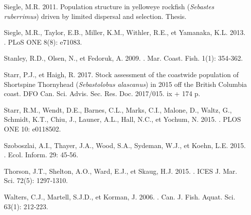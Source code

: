 \documentclass[french,11pt]{book}
\begin{document}
\begin{CSLReferences}{1}{0}
%
Siegle, M.R. 2011. Population structure in yelloweye rockfish ({\emph{Sebastes ruberrimus}}) driven by limited dispersal and selection. Thesis.

%
Siegle, M.R., Taylor, E.B., Miller, K.M., Withler, R.E., et Yamanaka, K.L. 2013. . PLoS ONE 8(8): e71083.

%
Stanley, R.D., Olsen, N., et Fedoruk, A. 2009. . Mar. Coast. Fish. 1(1): 354‑362.

%
Starr, P.J., et Haigh, R. 2017. Stock assessment of the coastwide population of {Shortspine Thornyhead} ({\emph{Sebastolobus alascanus}}) in 2015 off the {British Columbia} coast. {DFO} Can. Sci. Advis. Sec. Res. Doc. 2017/015. ix + 174 p.

%
Starr, R.M., Wendt, D.E., Barnes, C.L., Marks, C.I., Malone, D., Waltz, G., Schmidt, K.T., Chiu, J., Launer, A.L., Hall, N.C., et Yochum, N. 2015. . PLOS ONE 10: e0118502.

%
Szoboszlai, A.I., Thayer, J.A., Wood, S.A., Sydeman, W.J., et Koehn, L.E. 2015. . Ecol. Inform. 29: 45‑56.

%
Thorson, J.T., Shelton, A.O., Ward, E.J., et Skaug, H.J. 2015. . ICES J. Mar. Sci. 72(5): 1297‑1310.

%
Walters, C.J., Martell, S.J.D., et Korman, J. 2006. . Can. J. Fish. Aquat. Sci. 63(1): 212‑223.


\end{CSLReferences}
\end{document}
